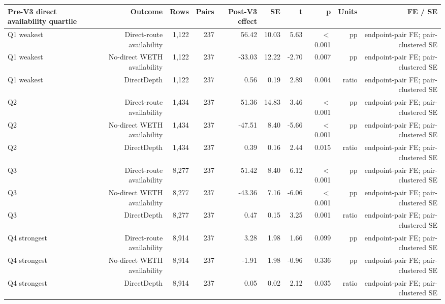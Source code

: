 \begin{tabular}{lrrrrrrrrr}
\toprule
Pre-V3 direct availability quartile & Outcome & Rows & Pairs & Post-V3 effect & SE & t & p & Units & FE / SE \\
\midrule
Q1 weakest & Direct-route availability & 1,122 & 237 & 56.42 & 10.03 & 5.63 & \ensuremath{<}0.001 & pp & endpoint-pair FE; pair-clustered SE \\
Q1 weakest & No-direct WETH availability & 1,122 & 237 & -33.03 & 12.22 & -2.70 & 0.007 & pp & endpoint-pair FE; pair-clustered SE \\
Q1 weakest & DirectDepth & 1,122 & 237 & 0.56 & 0.19 & 2.89 & 0.004 & ratio & endpoint-pair FE; pair-clustered SE \\
Q2 & Direct-route availability & 1,434 & 237 & 51.36 & 14.83 & 3.46 & \ensuremath{<}0.001 & pp & endpoint-pair FE; pair-clustered SE \\
Q2 & No-direct WETH availability & 1,434 & 237 & -47.51 & 8.40 & -5.66 & \ensuremath{<}0.001 & pp & endpoint-pair FE; pair-clustered SE \\
Q2 & DirectDepth & 1,434 & 237 & 0.39 & 0.16 & 2.44 & 0.015 & ratio & endpoint-pair FE; pair-clustered SE \\
Q3 & Direct-route availability & 8,277 & 237 & 51.42 & 8.40 & 6.12 & \ensuremath{<}0.001 & pp & endpoint-pair FE; pair-clustered SE \\
Q3 & No-direct WETH availability & 8,277 & 237 & -43.36 & 7.16 & -6.06 & \ensuremath{<}0.001 & pp & endpoint-pair FE; pair-clustered SE \\
Q3 & DirectDepth & 8,277 & 237 & 0.47 & 0.15 & 3.25 & 0.001 & ratio & endpoint-pair FE; pair-clustered SE \\
Q4 strongest & Direct-route availability & 8,914 & 237 & 3.28 & 1.98 & 1.66 & 0.099 & pp & endpoint-pair FE; pair-clustered SE \\
Q4 strongest & No-direct WETH availability & 8,914 & 237 & -1.91 & 1.98 & -0.96 & 0.336 & pp & endpoint-pair FE; pair-clustered SE \\
Q4 strongest & DirectDepth & 8,914 & 237 & 0.05 & 0.02 & 2.12 & 0.035 & ratio & endpoint-pair FE; pair-clustered SE \\
\bottomrule
\end{tabular}
